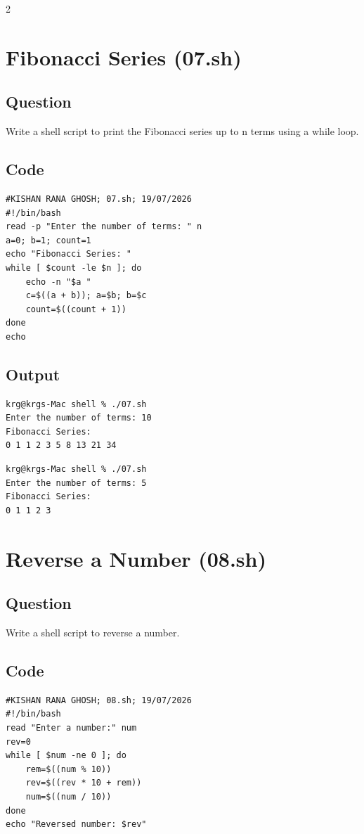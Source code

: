 \documentclass[a4paper,12pt]{article}
\begin{document}
\begin{multicols}{2}

\section{Fibonacci Series (07.sh)}
\subsection*{Question}
Write a shell script to print the Fibonacci series up to n terms using a while loop.

\subsection*{Code}
\begin{lstlisting}[style=bashstyle]
#KISHAN RANA GHOSH; 07.sh; 19/07/2026
#!/bin/bash
read -p "Enter the number of terms: " n
a=0; b=1; count=1
echo "Fibonacci Series: "
while [ $count -le $n ]; do
    echo -n "$a "
    c=$((a + b)); a=$b; b=$c
    count=$((count + 1))
done
echo
\end{lstlisting}

\subsection*{Output}
\begin{lstlisting}[style=outputstyle]
krg@krgs-Mac shell % ./07.sh
Enter the number of terms: 10
Fibonacci Series: 
0 1 1 2 3 5 8 13 21 34 
\end{lstlisting}
\begin{lstlisting}[style=outputstyle]
krg@krgs-Mac shell % ./07.sh
Enter the number of terms: 5
Fibonacci Series: 
0 1 1 2 3 
\end{lstlisting}

\columnbreak

\section{Reverse a Number (08.sh)}
\subsection*{Question}
Write a shell script to reverse a number.

\subsection*{Code}
\begin{lstlisting}[style=bashstyle]
#KISHAN RANA GHOSH; 08.sh; 19/07/2026
#!/bin/bash
read "Enter a number:" num
rev=0
while [ $num -ne 0 ]; do
    rem=$((num % 10))
    rev=$((rev * 10 + rem))
    num=$((num / 10))
done
echo "Reversed number: $rev"
\end{lstlisting}


\end{multicols}
\end{document}
